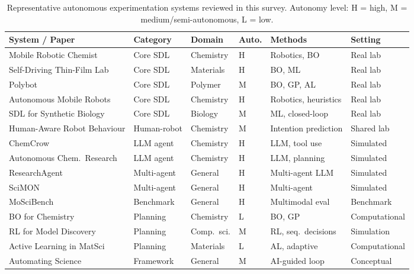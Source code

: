 \documentclass{article}
\begin{document}
\begin{table}[h]
\caption{Representative autonomous experimentation systems reviewed in this survey. Autonomy level: H = high, M = medium/semi-autonomous, L = low.}
\label{tab:systems}
\small
\begin{tabular}{p{3.8cm} p{1.4cm} p{1.6cm} p{1.2cm} p{2.8cm} p{1.5cm}}
\toprule
\textbf{System / Paper} & \textbf{Category} & \textbf{Domain} & \textbf{Auto.} & \textbf{Methods} & \textbf{Setting} \\
\midrule
Mobile Robotic Chemist \cite{burger2020mobile} & Core SDL & Chemistry & H & Robotics, BO & Real lab \\
Self-Driving Thin-Film Lab \cite{macleod2020self} & Core SDL & Materials & H & BO, ML & Real lab \\
Polybot \cite{gomes2021polybot} & Core SDL & Polymer & M & BO, GP, AL & Real lab \\
Autonomous Mobile Robots \cite{steiner2019organic} & Core SDL & Chemistry & H & Robotics, heuristics & Real lab \\
SDL for Synthetic Biology \cite{carbonell2019automating} & Core SDL & Biology & M & ML, closed-loop & Real lab \\
Human-Aware Robot Behaviour \cite{rozo2020learning} & Human-robot & Chemistry & M & Intention prediction & Shared lab \\
ChemCrow \cite{bran2023chemcrow} & LLM agent & Chemistry & H & LLM, tool use & Simulated \\
Autonomous Chem.\ Research \cite{boiko2023autonomous} & LLM agent & Chemistry & H & LLM, planning & Simulated \\
ResearchAgent \cite{baek2024researchagent} & Multi-agent & General & H & Multi-agent LLM & Simulated \\
SciMON \cite{wang2023scimon} & Multi-agent & General & H & Multi-agent & Simulated \\
MoSciBench \cite{he2024moscibench} & Benchmark & General & H & Multimodal eval & Benchmark \\
BO for Chemistry \cite{pyzer2018bayesian} & Planning & Chemistry & L & BO, GP & Computational \\
RL for Model Discovery \cite{degrave2022magnetic} & Planning & Comp.\ sci. & M & RL, seq.\ decisions & Simulation \\
Active Learning in MatSci \cite{lookman2019active} & Planning & Materials & L & AL, adaptive & Computational \\
Automating Science \cite{king2009automation} & Framework & General & M & AI-guided loop & Conceptual \\
\bottomrule
\end{tabular}
\end{table}
\end{document}
